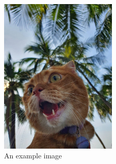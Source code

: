 \documentclass{article}
\begin{document}
\lipsum[31-40]

\lipsum[41-50]
\begin{figure}[p] %
	\centering %
	\includegraphics[width=0.5\textwidth, angle=75, scale=0.5]{garfield.JPG}
	\caption{An example image}
\end{figure}
\lipsum[51-60]
\end{document}
